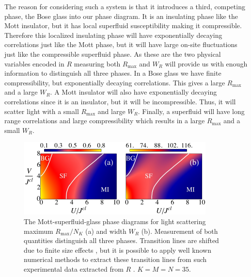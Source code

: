The reason for considering such a system is that it introduces a
third, competing phase, the Bose glass into our phase diagram. It is
an insulating phase like the Mott insulator, but it has local
superfluid susceptibility making it compressible. Therefore this
localized insulating phase will have exponentially decaying
correlations just like the Mott phase, but it will have large on-site
fluctuations just like the compressible superfluid phase. As these are
the two physical variables encoded in $R$ measuring both
$R_\text{max}$ and $W_R$ will provide us with enough information to
distinguish all three phases. In a Bose glass we have finite
compressibility, but exponentially decaying correlations. This gives a
large $R_\text{max}$ and a large $W_R$. A Mott insulator will also
have exponentially decaying correlations since it is an insulator, but
it will be incompressible. Thus, it will scatter light with a small
$R_\text{max}$ and large $W_R$. Finally, a superfluid will have long
range correlations and large compressibility which results in a large
$R_\text{max}$ and a small $W_R$.

\begin{figure}[htbp!]  
  \centering
  \includegraphics[width=\linewidth]{oph22}
  \caption[Mapping the Disoredered Phase Diagram]{The
    Mott-superfluid-glass phase diagrams for light scattering maximum
    $R_\text{max}/N_K$ (a) and width $W_R$ (b). Measurement of both
    quantities distinguish all three phases. Transition lines are
    shifted due to finite size effects \cite{roux2008}, but it is
    possible to apply well known numerical methods to extract these
    transition lines from such experimental data extracted from $R$
    \cite{ejima2011}. $K=M=N=35$.}
  \label{fig:BG}
\end{figure}

